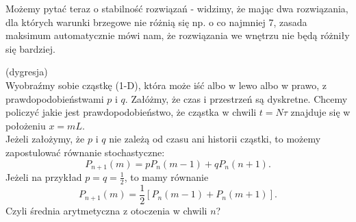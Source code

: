 \documentclass[../main.tex]{subfiles}
\begin{document}
		Możemy pytać teraz o stabilność rozwiązań - widzimy, że mając dwa rozwiązania, dla których warunki brzegowe nie różnią się np. o co najmniej 7, zasada maksimum automatycznie mówi nam, że rozwiązania we wnętrzu nie będą różniły się bardziej.
		\begin{przyklad}
				(dygresja)\\
				Wyobraźmy sobie cząstkę (1-D), która może iść albo w lewo albo w prawo, z prawdopodobieństwami $p$ i $q$. Załóżmy, że czas i przestrzeń są dyskretne. Chcemy policzyć jakie jest prawdopodobieństwo, że cząstka w chwili $t = N\tau$ znajduje się w położeniu $x = mL$.\\
				Jeżeli założymy, że $p$ i $q$ nie zależą od czasu ani historii cząstki, to możemy zapostulować równanie stochastyczne:
				\[
						P_{n+1}(m) = p P_n(m-1)+qP_n(n+1)
				.\]
				Jeżeli na przykład $p = q = \frac{1}{2}$, to mamy równanie
				\[
						P_{n+1}(m) = \frac{1}{2}\left[ P_n(m-1) + P_n(m+1) \right] .
				\]
				Czyli średnia arytmetyczna z otoczenia w chwili $n$?
		\end{przyklad}
\end{document}

